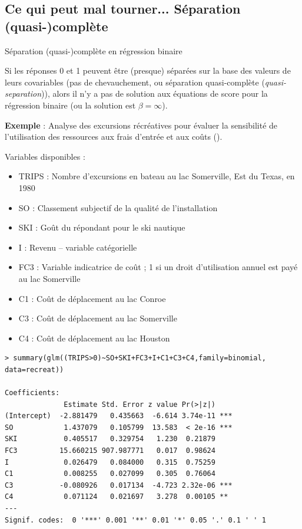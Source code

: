 \documentclass{BeamerTemplate}
\begin{document}
\begin{refsection}
\begin{frame}{}
\end{frame}

\subsection{Ce qui peut mal tourner... Séparation (quasi-)complète}
\begin{frame}{Séparation (quasi-)complète en régression binaire}

Si les réponses 0 et 1 peuvent être (presque) séparées sur la base des
valeurs de leurs covariables ({\color{blue}pas de chevauchement, ou séparation quasi-complète} (\textit{quasi-separation})), alors il n'y a pas de solution aux
équations de score pour la régression binaire (ou la solution est
$\beta=\infty$).

\bigskip
\textbf{Exemple} : Analyse des excursions récréatives pour évaluer la sensibilité de
l'utilisation des ressources aux frais d'entrée et aux coûts ().
\end{frame}

\begin{frame}{}
Variables disponibles :
\begin{itemize}
\item TRIPS : Nombre d'excursions en bateau au lac Somerville, Est du Texas, en 1980
\item SO : Classement subjectif de la qualité de l'installation
\item SKI : Goût du répondant pour le ski nautique 
\item I : Revenu -- variable catégorielle 
\item FC3 : Variable indicatrice de coût ; 1 si un droit d'utilisation annuel est payé au lac Somerville 
\item C1 : Coût de déplacement au lac Conroe 
\item C3 : Coût de déplacement au lac Somerville
\item C4 : Coût de déplacement au lac Houston 
\end{itemize}
\end{frame}

\begin{frame}[fragile]{}
{\scriptsize
\begin{verbatim}
> summary(glm((TRIPS>0)~SO+SKI+FC3+I+C1+C3+C4,family=binomial,
data=recreat))

Coefficients:
              Estimate Std. Error z value Pr(>|z|)    
(Intercept)  -2.881479   0.435663  -6.614 3.74e-11 ***
SO            1.437079   0.105799  13.583  < 2e-16 ***
SKI           0.405517   0.329754   1.230  0.21879    
FC3          15.660215 907.987771   0.017  0.98624    
I             0.026479   0.084000   0.315  0.75259    
C1            0.008255   0.027099   0.305  0.76064    
C3           -0.080926   0.017134  -4.723 2.32e-06 ***
C4            0.071124   0.021697   3.278  0.00105 ** 
---
Signif. codes:  0 '***' 0.001 '**' 0.01 '*' 0.05 '.' 0.1 ' ' 1


\end{verbatim}}
\end{frame}
\end{refsection}
\end{document}
